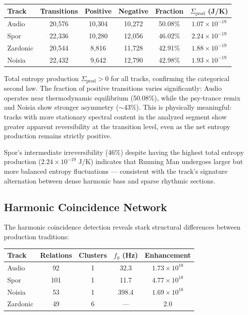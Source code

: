 \documentclass[twocolumn,10pt]{article}
\theoremstyle{remark}
\begin{document}
\begin{center}
\begin{tabular}{lccccc}
\toprule
Track & Transitions & Positive & Negative & Fraction & $\Sigma_{\mathrm{prod}}$ (J/K) \\
\midrule
Audio   & 20{,}576 & 10{,}304 & 10{,}272 & 50.08\% & $1.07 \times 10^{-19}$ \\
Spor          & 22{,}336 & 10{,}280 & 12{,}056 & 46.02\% & $2.24 \times 10^{-19}$ \\
Zardonic  & 20{,}544 &  8{,}816 & 11{,}728 & 42.91\% & $1.88 \times 10^{-19}$ \\
Noisia        & 22{,}432 &  9{,}642 & 12{,}790 & 42.98\% & $1.93 \times 10^{-19}$ \\
\bottomrule
\end{tabular}
\end{center}

Total entropy production $\Sigma_{\mathrm{prod}} > 0$ for all tracks, confirming the categorical second law. The fraction of positive transitions varies significantly: Audio operates near thermodynamic equilibrium (50.08\%), while the psy-trance remix and Noisia show stronger asymmetry ($\sim$43\%). This is physically meaningful: tracks with more stationary spectral content in the analyzed segment show greater apparent reversibility at the transition level, even as the net entropy production remains strictly positive.

Spor's intermediate irreversibility (46\%) despite having the highest total entropy production ($2.24 \times 10^{-19}$ J/K) indicates that Running Man undergoes larger but more balanced entropy fluctuations --- consistent with the track's signature alternation between dense harmonic bass and sparse rhythmic sections.

\subsection{Harmonic Coincidence Network}

The harmonic coincidence detection reveals stark structural differences between production traditions:

\begin{center}
\begin{tabular}{lcccc}
\toprule
Track & Relations & Clusters & $f_0$ (Hz) & Enhancement \\
\midrule
Audio  & 92  & 1 & 32.3  & $1.73 \times 10^{18}$ \\
Spor         & 101 & 1 & 11.7  & $4.77 \times 10^{18}$ \\
Noisia       & 53  & 1 & 398.4 & $1.69 \times 10^{18}$ \\
Zardonic & 49  & 6 & ---   & $2.0$ \\
\bottomrule
\end{tabular}
\end{center}
\end{document}
